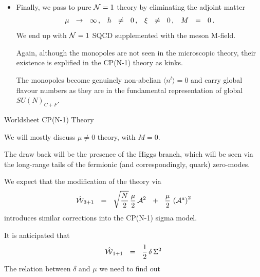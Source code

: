 \documentclass[12pt,letterpaper,landscape,KOMA,smallheadings,calcdimensions,display]{powersem}
\begin{document}
\begin{slide}
\begin{itemize}
\item
	Finally, we pass to pure $\mathcal{N}=1$ theory by eliminating the adjoint matter
\[
	\mu ~~\to~~ \infty\,\text, \quad h ~~\neq~~ 0\,\text, \quad \xi ~~\neq~~ 0 \,\text, \quad  M ~~=~~ 0\,\text{.}	
\]
	We end up with $\mathcal{N}=1$ SQCD supplemented with the meson M-field.

	Again, although the monopoles are not seen in the microscopic theory, their
	existence is explified in the CP(N-1) theory as kinks.

	The monopoles become genuinely non-abelian $ \langle n^l \rangle = 0 $ and
	carry global flavour numbers as they are in the fundamental representation
	of global $ SU(N)_{C+F} $.
\end{itemize}
\end{slide}

\begin{slide}
\vspace*{2.0cm}
\fontsize{40pt}{40pt}\selectfont
\begin{center} 
	Worldsheet CP(N-1) Theory
\end{center}
\vspace*{\fill}
\end{slide}

\begin{slide}
	We will mostly discuss $ \mu \neq 0 $ theory, with $ M = 0 $.

	The draw back will be the presence of the Higgs branch, which will be seen via
	the long-range tails of the fermionic (and correspondingly, quark) zero-modes.

	We expect that the modification of the theory via 
\[
	\hat{\mathcal{W}}{}_{3+1} ~~=~~ \sqrt{\frac{N}{2}}\,\frac{\mu}{2}\, \mathcal{A}^2 ~~+~~ \frac{\mu}{2}\,\left(\mathcal{A}^a\right)^2 
\] 
	introduces similar corrections into the CP(N-1) sigma model.

	It is anticipated that 
\[
	\hat{\mathcal{W}}{}_{1+1}  ~~=~~ \frac{1}{2} \, \delta \, \Sigma^2
\]
	The relation between $ \delta $ and $ \mu $ we need to find out
\end{slide}
\end{document}
